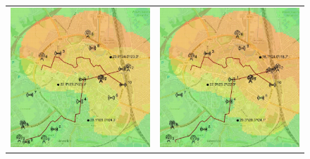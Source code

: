 \begin{figure}[h]
    \centering
    \begin{tabular}{ll}
         \includegraphics[scale=0.42]{figures/simACsnap1s.png}  &
         \includegraphics[scale=0.42]{figures/simACsnap2s.png}

\end{tabular}
\end{figure}

